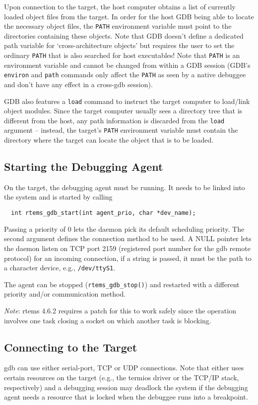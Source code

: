 \documentclass{article}
\newcommand{\cmd}[1]{{\tt #1}}
\begin{document}
	Upon connection to the target, the host computer obtains
	a list of currently loaded object files from the target.
	In order for the host GDB being able to locate the necessary
	object files, the {\tt PATH} environment variable must point to
	the directories containing these objects. Note that GDB
	doesn't define a dedicated path variable for `cross-architecture
	objects' but requires the user to set the ordinary {\tt PATH}
	that is also searched for host executables!
	Note that {\tt PATH} is an environment variable and cannot be
	changed from within a GDB session (GDB's \cmd{environ} and \cmd{path}
	commands only affect the {\tt PATH} as seen by a native debuggee
	and don't have any effect in a cross-gdb session).

	GDB also features a \cmd{load} command to instruct the target
	computer to load/link object modules. Since the target
	computer usually sees a directory tree that is different
	from the host, any path information is discarded from the
	\cmd{load} argument -- instead, the target's {\tt PATH} environment
	variable must contain the directory where the target can
	locate the object that is to be loaded.

\subsection{Starting the Debugging Agent}
	On the target, the debugging agent must be running.
	It needs to be linked into the system and is started
	by calling
\begin{verbatim}
  int rtems_gdb_start(int agent_prio, char *dev_name);
\end{verbatim}

	Passing a priority of 0 lets the daemon pick its default
	scheduling priority. The second argument defines the
	connection method to be used. A NULL pointer lets the
	daemon listen on TCP port 2159 (registered port number for the
	gdb remote protocol) for an incoming connection,
	if a string is passed, it must be the path to a character
	device, e.g., {\tt /dev/ttyS1}.

	The agent can be stopped (\verb|rtems_gdb_stop()|) and restarted
	with a different priority and/or communication method.

	{\em Note\/}: rtems 4.6.2 requires a patch for this to work safely
	since the operation involves one task closing a socket
	on which another task is blocking.

\subsection{Connecting to the Target}
	gdb can use either serial-port, TCP or UDP connections.
	Note that either uses certain resources on the target (e.g.,
	the termios driver or the TCP/IP stack, respectively)
	and a debugging session may deadlock the system if
	the debugging agent needs a resource that is locked
	when the debuggee runs into a breakpoint.
\end{document}
